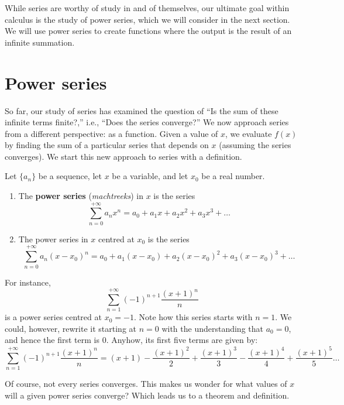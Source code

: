 While series are worthy of study in and of themselves, our ultimate goal within calculus is the study of power series, which we will consider in the next section. We will use power series to create functions where the output is the result of an infinite summation.

\section{Power series}\label{sec:power_series}

So far, our study of series has examined the question of ``Is the sum of these infinite terms finite?,'' i.e., ``Does the series converge?'' We now approach series from a different perspective: as a function. Given a value of $x$, we evaluate $f(x)$ by finding the sum of a particular series that depends on $x$ (assuming the series converges). We start this new approach to series with a definition.

\pagebreak

\begin{definition}\label{def:power_series}
Let $\{a_n\}$ be a sequence, let $x$ be a variable, and let $x_0$ be a real number.
	\begin{enumerate}
		\item The \textbf{power series} (\textit{machtreeks}) in $x$ is the series
		$$\sum_{n=0}^{+\infty} a_nx^n = a_0+a_1x+a_2x^2+a_3x^3+\ldots$$
		
		\item The power series in $x$ centred at $x_0$ is the series
		$$\sum_{n=0}^{+\infty} a_n(x-x_0)^n = a_0+a_1(x-x_0)+a_2(x-x_0)^2+a_3(x-x_0)^3+\ldots$$
	\end{enumerate}
\end{definition}

For instance, 
$$
\sum_{n=1}^{+\infty} (-1)^{n+1}\frac{(x+1)^n}{n}
$$
is a power series centred at $x_0=-1$.  Note how this series starts with $n=1$. We could, however, rewrite it starting at $n=0$ with the understanding that $a_0=0$, and hence the first term is $0$. Anyhow, its first five terms are given by:
	$$\sum_{n=1}^{+\infty} (-1)^{n+1}\frac{(x+1)^n}n = (x+1) - \frac{(x+1)^2}{2} + \frac{(x+1)^3}{3} - \frac{(x+1)^4}{4}+\frac{(x+1)^5}{5}\ldots$$
	
Of course, not every series converges. This makes us wonder for what values of $x$ will a given power series converge? Which  leads us to a theorem and definition.


